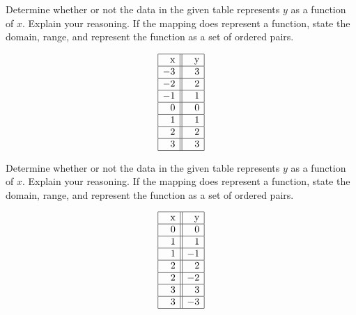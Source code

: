 \documentclass{ximera}
\begin{document}










\begin{problem}
Determine whether or not the data in the given table represents $y$ as a function of $x$.  Explain your reasoning.  If the mapping does represent a function, state the domain, range, and represent the function as a set of ordered pairs.

\label{tablefirst}
    \[\begin{array}{|r||r|}  \hline

$x$  & \hphantom{\text{$-$}} $y$  \\ \hline
 -3 &  3 \\  \hline
 -2 & 2  \\  \hline
  -1 &  1  \\  \hline
 0 &  0 \\  \hline
 1 & 1  \\  \hline
 2 &  2 \\  \hline
 3 & 3  \\  \hline

\end{array}\]
\end{problem}

\begin{problem}\label{tablelast}
Determine whether or not the data in the given table represents $y$ as a function of $x$.  Explain your reasoning.  If the mapping does represent a function, state the domain, range, and represent the function as a set of ordered pairs.

    \[\begin{array}{|r||r|}  \hline

\hphantom{\text{$-$}} $x$  &$y$  \\ \hline

 0 & 0 \\  \hline
 1 & 1  \\  \hline
 1 & -1  \\  \hline
 2 &  2 \\  \hline
 2 & -2  \\  \hline
 3 &  3 \\  \hline
 3 & -3  \\  \hline

\end{array}\]
\end{problem}
\end{document}
